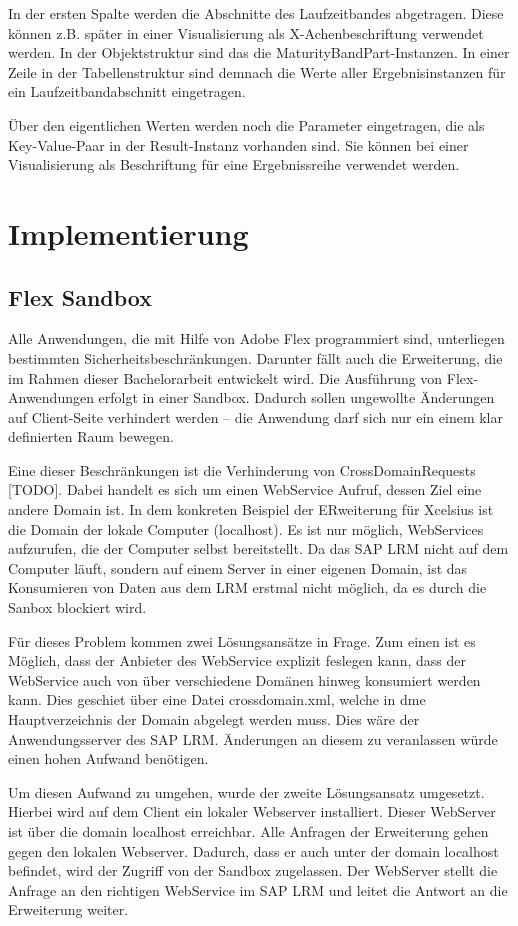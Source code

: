 In der ersten Spalte werden die Abschnitte des Laufzeitbandes abgetragen. Diese können z.B. später in einer Visualisierung als X-Achenbeschriftung verwendet werden. In der Objektstruktur sind das die MaturityBandPart-Instanzen. In einer Zeile in der Tabellenstruktur sind demnach die Werte aller Ergebnisinstanzen für ein Laufzeitbandabschnitt eingetragen.

Über den eigentlichen Werten werden noch die Parameter eingetragen, die als Key-Value-Paar in der Result-Instanz vorhanden sind. Sie können bei einer Visualisierung als Beschriftung für eine Ergebnissreihe verwendet werden.

\section{Implementierung}
\newpage
\subsection{Flex Sandbox}
Alle Anwendungen, die mit Hilfe von Adobe Flex programmiert sind, unterliegen bestimmten Sicherheitsbeschränkungen. Darunter fällt auch die Erweiterung, die im Rahmen dieser Bachelorarbeit entwickelt wird. Die Ausführung von Flex-Anwendungen erfolgt in einer Sandbox. Dadurch sollen ungewollte Änderungen auf Client-Seite verhindert werden -- die Anwendung darf sich nur ein einem klar definierten Raum bewegen.

Eine dieser Beschränkungen ist die Verhinderung von CrossDomainRequests [TODO]. Dabei handelt es sich um einen WebService Aufruf, dessen Ziel eine andere Domain ist. In dem konkreten Beispiel der ERweiterung für Xcelsius ist die Domain der lokale Computer (localhost). Es ist nur möglich, WebServices aufzurufen, die der Computer selbst bereitstellt. Da das SAP LRM nicht auf dem Computer läuft, sondern auf einem Server in einer eigenen Domain, ist das Konsumieren von Daten aus dem LRM erstmal nicht möglich, da es durch die Sanbox blockiert wird.

Für dieses Problem kommen zwei Lösungsansätze in Frage. Zum einen ist es Möglich, dass der Anbieter des WebService explizit feslegen kann, dass der WebService auch von über verschiedene Domänen hinweg konsumiert werden kann. Dies geschiet über eine Datei crossdomain.xml, welche in dme Hauptverzeichnis der Domain abgelegt werden muss. Dies wäre der Anwendungsserver des SAP LRM. Änderungen an diesem zu veranlassen würde einen hohen Aufwand benötigen. 

Um diesen Aufwand zu umgehen, wurde der zweite Lösungsansatz umgesetzt. Hierbei wird auf dem Client ein lokaler Webserver installiert. Dieser WebServer ist über die domain localhost erreichbar. Alle Anfragen der Erweiterung gehen gegen den lokalen Webserver. Dadurch, dass er auch unter der domain localhost befindet, wird der Zugriff von der Sandbox zugelassen. Der WebServer stellt die Anfrage an den richtigen WebService im SAP LRM und leitet die Antwort an die Erweiterung weiter.

